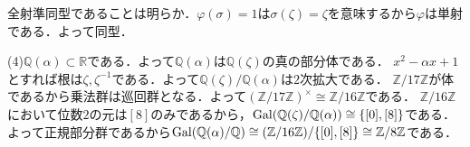 \documentclass[
		book,
		head_space=20mm,
		foot_space=20mm,
		gutter=10mm,
		line_length=190mm
]{jlreq}
\begin{document}
全射準同型であることは明らか．$\varphi(\sigma)=1$は$\sigma(\zeta)=\zeta$を意味するから$\varphi$は単射である．よって同型．

(4)$\mathbb{Q}(\alpha)\subset \mathbb{R}$である．よって$\mathbb{Q}(\alpha)$は$\mathbb{Q}(\zeta)$の真の部分体である．
$x^2-\alpha x+1$とすれば根は$\zeta,\zeta^{-1}$である．よって$\mathbb{Q}(\zeta)/\mathbb{Q}(\alpha)$は$2$次拡大である．
$\mathbb{Z}/ 17 \mathbb{Z}$が体であるから乗法群は巡回群となる．よって$(\mathbb{Z}/17 \mathbb{Z})^\times\cong \mathbb{Z}/16 \mathbb{Z}$である．
$\mathbb{Z}/16 \mathbb{Z}$において位数$2$の元は$[8]$のみであるから，$\mathop{\mathrm{Gal}}(\mathbb{Q}(\zeta)/\mathbb{Q}(\alpha))\cong \{ [0],[8]\}$である．
よって正規部分群であるから$\mathop{\mathrm{Gal}}(\mathbb{Q}(\alpha)/\mathbb{Q})\cong (\mathbb{Z}/16 \mathbb{Z})/\{ [0],[8]\}\cong \mathbb{Z}/ 8 \mathbb{Z}$である．
\end{document}
